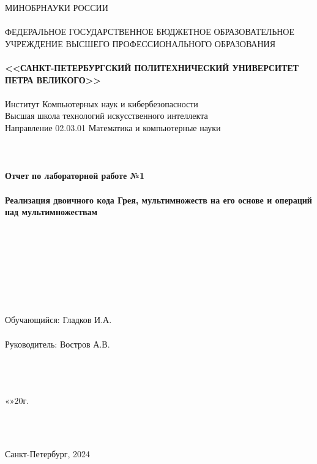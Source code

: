 \documentclass[10pt,a4paper,final]{article} %
\begin{document}
	
	\thispagestyle{empty}
	
	\begin{center}
		{\Large МИНОБРНАУКИ РОССИИ}\\
		~\\
		{\large ФЕДЕРАЛЬНОЕ ГОСУДАРСТВЕННОЕ БЮДЖЕТНОЕ ОБРАЗОВАТЕЛЬНОЕ УЧРЕЖДЕНИЕ ВЫСШЕГО ПРОФЕССИОНАЛЬНОГО ОБРАЗОВАНИЯ}\\
		~\\
		{\Large \bf <<САНКТ-ПЕТЕРБУРГСКИЙ ПОЛИТЕХНИЧЕСКИЙ УНИВЕРСИТЕТ ПЕТРА ВЕЛИКОГО>>}\\
		~\\
		{\large Институт Компьютерных наук и кибербезопасности}\\
		{\large Высшая школа технологий искусственного интеллекта}\\
		{\large Направление 02.03.01 Математика и компьютерные науки}\\
		~\\
		~\\
		~\\
		{\Large \bf Отчет по лабораторной работе №1}\\
		~\\
		{\Large \bf Реализация двоичного кода Грея, мультимножеств на его основе и операций над мультимножествам}\\
		~\\
		~\\
		~\\
		~\\
		~\\
		~\\
		~\\
		~\\
		{\large Обучающийся: \underline{\hspace{3.5cm}} \qquad\qquad Гладков И.А.}\\
		~\\
		{\large Руководитель: \underline{\hspace{3.5cm}} \hspace{14mm} Востров А.В.}\\
		~\\
		~\\
		~\\
	\end{center}
	\begin{flushright}
	
	«\underline{\hspace{1cm}}»\underline{\hspace{3cm}}20\underline{\hspace{0.7cm}}г.
\end{flushright}
~\\
~\\
\begin{center}
	{\large Санкт-Петербург, 2024}
\end{center}
	\newpage
\end{document}
